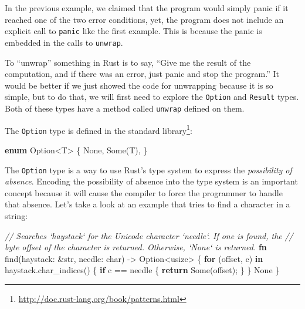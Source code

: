 \documentclass[a4paper,]{book}
\newenvironment{Shaded}{\begin{snugshade}}{\end{snugshade}}
\newcommand{\KeywordTok}[1]{\textcolor[rgb]{0.13,0.29,0.53}{\textbf{{#1}}}}
\newcommand{\DataTypeTok}[1]{\textcolor[rgb]{0.13,0.29,0.53}{{#1}}}
\newcommand{\ConstantTok}[1]{\textcolor[rgb]{0.00,0.00,0.00}{{#1}}}
\newcommand{\CommentTok}[1]{\textcolor[rgb]{0.56,0.35,0.01}{\textit{{#1}}}}
\newcommand{\NormalTok}[1]{{#1}}
\renewcommand{\href}[2]{#2\footnote{\url{#1}}}
\begin{document}

In the previous example, we claimed that the program would simply panic
if it reached one of the two error conditions, yet, the program does not
include an explicit call to \texttt{panic} like the first example. This
is because the panic is embedded in the calls to \texttt{unwrap}.

To ``unwrap'' something in Rust is to say, ``Give me the result of the
computation, and if there was an error, just panic and stop the
program.'' It would be better if we just showed the code for unwrapping
because it is so simple, but to do that, we will first need to explore
the \texttt{Option} and \texttt{Result} types. Both of these types have
a method called \texttt{unwrap} defined on them.


The \texttt{Option} type is
\href{http://doc.rust-lang.org/book/patterns.html}{defined in the
standard library}:

\begin{Shaded}
\begin{Highlighting}[]
\KeywordTok{enum} \DataTypeTok{Option}\NormalTok{<T> \{}
    \ConstantTok{None}\NormalTok{,}
    \ConstantTok{Some}\NormalTok{(T),}
\NormalTok{\}}
\end{Highlighting}
\end{Shaded}

The \texttt{Option} type is a way to use Rust's type system to express
the \emph{possibility of absence}. Encoding the possibility of absence
into the type system is an important concept because it will cause the
compiler to force the programmer to handle that absence. Let's take a
look at an example that tries to find a character in a string:

\begin{Shaded}
\begin{Highlighting}[]
\CommentTok{// Searches `haystack` for the Unicode character `needle`. If one is found, the}
\CommentTok{// byte offset of the character is returned. Otherwise, `None` is returned.}
\KeywordTok{fn} \NormalTok{find(haystack: &}\DataTypeTok{str}\NormalTok{, needle: }\DataTypeTok{char}\NormalTok{) -> }\DataTypeTok{Option}\NormalTok{<}\DataTypeTok{usize}\NormalTok{> \{}
    \KeywordTok{for} \NormalTok{(offset, c) }\KeywordTok{in} \NormalTok{haystack.char_indices() \{}
        \KeywordTok{if} \NormalTok{c == needle \{}
            \KeywordTok{return} \ConstantTok{Some}\NormalTok{(offset);}
        \NormalTok{\}}
    \NormalTok{\}}
    \ConstantTok{None}
\NormalTok{\}}
\end{Highlighting}
\end{Shaded}
\end{document}
